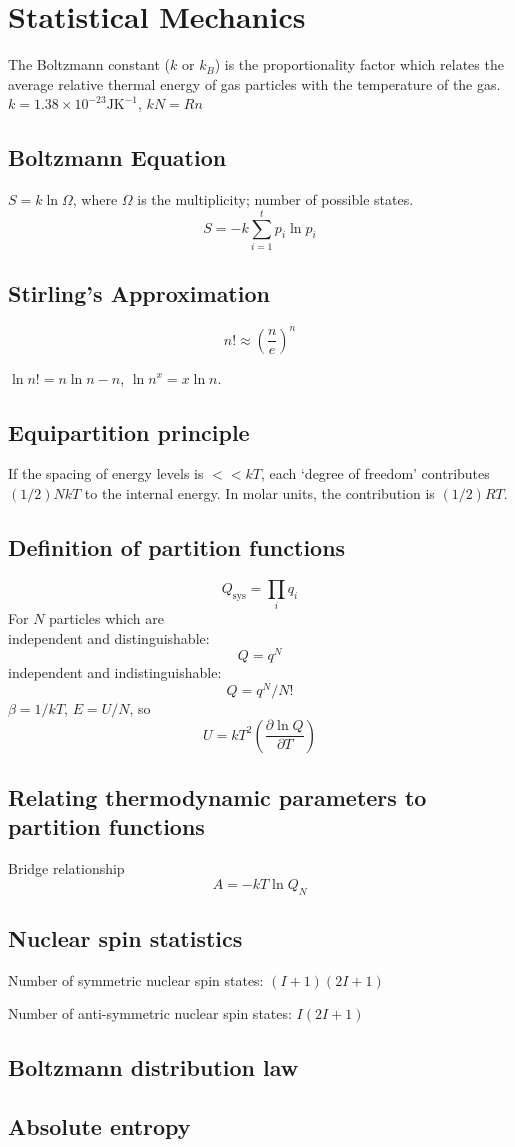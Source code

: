 \pagebreak
\section{Statistical Mechanics}
The Boltzmann constant ($k$ or $k_B$) is the proportionality factor which relates the average relative thermal energy 
of gas particles with the temperature of the gas.
$k = 1.38 \times 10^{-23} \mathrm{J} \mathrm{K}^{-1}$, $kN = Rn$

\subsection*{Boltzmann Equation}
$S = k \ln \Omega$, where $\Omega$ is the multiplicity; number of possible states.
\begin{equation*}
    S = -k \sum_{i = 1}^{t}p_i \ln p_i
\end{equation*}

\subsection*{Stirling's Approximation}
\begin{equation*}
    n! \approx \left(\frac{n}{e}\right)^n
\end{equation*}

$\ln n! = n \ln n - n$, $\ln n^x = x \ln n$.

\subsection*{Equipartition principle}
If the spacing of energy levels is $<< kT$, each `degree of freedom' contributes $(1/2)NkT$ to the internal energy. 
In molar units, the contribution is $(1/2)RT$.

\subsection*{Definition of partition functions}
\begin{equation*}
    Q_{\mathrm{sys}} = \prod_{i} q_i
\end{equation*}
For $N$ particles which are \\
independent and distinguishable: $$Q = q^N$$independent and indistinguishable: $$Q = q^N/N!$$
$\beta = 1/kT$, $E = U/N$, so $$U = kT^2\left(\frac{\partial \ln Q}{\partial T}\right)$$

\subsection*{Relating thermodynamic parameters to partition functions}
Bridge relationship
\begin{equation*}
    A = -kT \ln Q_N
\end{equation*}
\subsection*{Nuclear spin statistics}
Number of symmetric nuclear spin states: $(I + 1)(2I + 1)$

Number of anti-symmetric nuclear spin states: $I(2I + 1)$

\subsection*{Boltzmann distribution law}
\subsection*{Absolute entropy}
\columnbreak